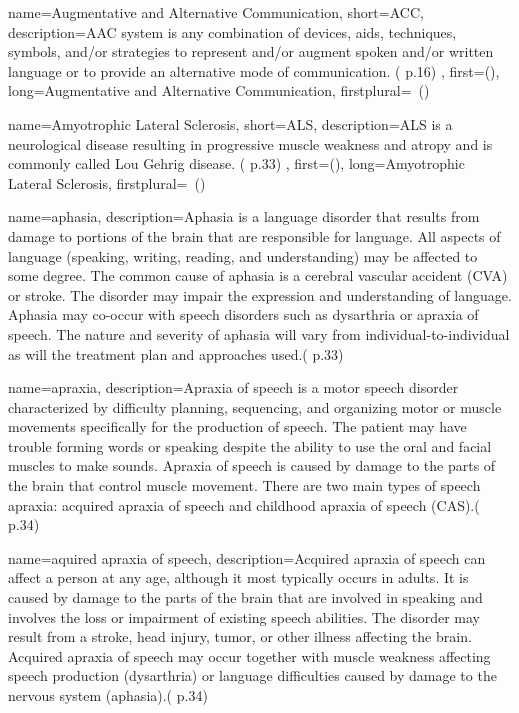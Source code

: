 {
	name={Augmentative and Alternative Communication}, 
	short={ACC},
	description={AAC system is any combination of devices, aids, techniques, symbols, and/or strategies to represent and/or augment spoken and/or written language or to provide an alternative mode of communication. (\cite{SLPathologies} p.16)
},
first={}(),
	long={Augmentative and Alternative Communication},
	firstplural={\glspluralsuffix\ (\glspluralsuffix )}
}

 {
	name={Amyotrophic Lateral Sclerosis}, 
	short={ALS},
	description={ALS is a neurological disease resulting in progressive muscle weakness and atropy and is commonly called Lou Gehrig disease. (\cite{SLPathologies} p.33)
},
first={}(),
	long={Amyotrophic Lateral Sclerosis},
	firstplural={\glspluralsuffix\ (\glspluralsuffix )}
}

 {
	name={aphasia}, 
	description={Aphasia is a language disorder that results from damage to portions of the brain that are responsible for language. All aspects of language (speaking, writing, reading, and understanding) may be affected to some degree. The common cause of aphasia is a cerebral vascular accident (CVA) or stroke. The disorder may impair the expression and understanding of language. Aphasia may co-occur with speech disorders such as dysarthria or apraxia of speech. The nature and severity of aphasia will vary from individual-to-individual as will the treatment plan and approaches used.(\cite{SLPathologies} p.33)
}
}


 {
	name={apraxia}, 
	description={Apraxia of speech is a motor speech disorder characterized by difficulty planning, sequencing, and organizing motor or muscle movements specifically for the production of speech. The patient may have trouble forming words or speaking despite the ability to use the oral and facial muscles to make sounds. Apraxia of speech is caused by damage to the parts of the brain
that control muscle movement. There are two main types of speech apraxia: acquired apraxia of speech and childhood apraxia of speech (CAS).(\cite{SLPathologies} p.34)
}
}

 {
	name={aquired apraxia of speech}, 
	description={Acquired apraxia of speech can affect a person at any age, although it most typically occurs in adults. It is caused by damage to the parts of the brain that are involved in speaking and involves the loss or impairment of existing speech abilities. The disorder may result from a stroke, head injury, tumor, or other illness affecting the brain. Acquired apraxia of speech may
occur together with muscle weakness affecting speech production (dysarthria) or language difficulties caused by damage to the nervous system (aphasia).(\cite{SLPathologies} p.34)
}
}

